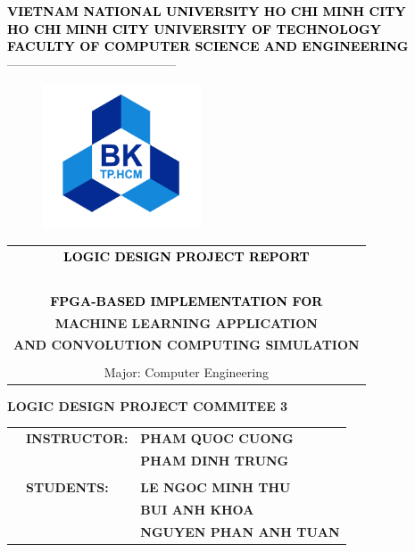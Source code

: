 \documentclass[12pt,twoside]{Book}
\begin{document}
\begin{titlepage}
\begin{center}
\textcolor{black}{\textbf{\large VIETNAM NATIONAL UNIVERSITY HO CHI MINH CITY}} \\
\textcolor{black}{\textbf{ \large HO CHI MINH CITY UNIVERSITY OF TECHNOLOGY}}\\
\textcolor{black}{\textbf{\large FACULTY OF COMPUTER SCIENCE AND ENGINEERING}}\\
-----------------------------------------
\end{center}

\vspace{1cm}

\begin{figure}[h!]
\begin{center}
\includegraphics[width=4.7cm]{source/picture/3_Logo_BK.png}
\end{center}
\end{figure}

\vspace{0.7cm}


\begin{center}
\begin{tabular}{c}
	\multicolumn{1}{c}{\textcolor{black}{\textbf{{\large LOGIC DESIGN PROJECT REPORT}}}}\\
    ~~\\
    \textbf{{\textcolor{black}{\LARGE FPGA-BASED IMPLEMENTATION FOR }}}\\
    
    \textbf{\LARGE MACHINE LEARNING APPLICATION}\\
    \textbf{\LARGE AND CONVOLUTION COMPUTING SIMULATION}\\
    \\
    \large Major: Computer Engineering
\end{tabular}
\end{center}

\vspace{1.2cm}
\hspace{5.7cm}\textbf{LOGIC DESIGN PROJECT COMMITEE 3}
\begin{table}[h]
\begin{tabular}{rll}
\hspace{5cm}
& \textbf{INSTRUCTOR:} &\textbf{PHAM QUOC CUONG}\\
& & \textbf{PHAM DINH TRUNG}\\
\\
& \textbf{STUDENTS:} & \textbf{LE NGOC MINH THU }\\ 
& &\textbf{BUI ANH KHOA}\\
& &\textbf{NGUYEN PHAN ANH TUAN }


\end{tabular}
\end{table}
\end{titlepage}
\end{document}
